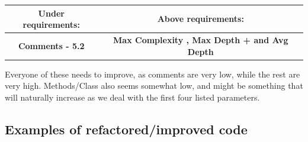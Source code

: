 \documentclass{article}
\begin{document}
\begin{center}
\begin{tabulary}{0.5\textwidth}{| c | c |}
  \hline
Under requirements: & Above requirements: \\ \hline
\textbf{Comments - 5.2} & \textbf{Max Complexity , Max Depth + and Avg Depth } \\ \hline
\end{tabulary}
\end{center}

Everyone of these needs to improve, as comments are very low, while the rest are very high. Methods/Class also seems somewhat low, and might be something that will naturally increase as we deal with the first four listed parameters.


\subsection{Examples of refactored/improved code}
\end{document}
